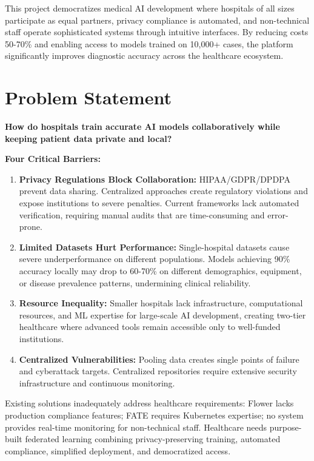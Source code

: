 This project democratizes medical AI development where hospitals of all sizes participate as equal partners, privacy compliance is automated, and non-technical staff operate sophisticated systems through intuitive interfaces. By reducing costs 50-70\% and enabling access to models trained on 10,000+ cases, the platform significantly improves diagnostic accuracy across the healthcare ecosystem.

\section{Problem Statement}

\textbf{How do hospitals train accurate AI models collaboratively while keeping patient data private and local?}

\textbf{Four Critical Barriers:}

\begin{enumerate}
    \item \textbf{Privacy Regulations Block Collaboration:} HIPAA/GDPR/DPDPA prevent data sharing. Centralized approaches create regulatory violations and expose institutions to severe penalties. Current frameworks lack automated verification, requiring manual audits that are time-consuming and error-prone.
    \item \textbf{Limited Datasets Hurt Performance:} Single-hospital datasets cause severe underperformance on different populations. Models achieving 90\% accuracy locally may drop to 60-70\% on different demographics, equipment, or disease prevalence patterns, undermining clinical reliability.
    \item \textbf{Resource Inequality:} Smaller hospitals lack infrastructure, computational resources, and ML expertise for large-scale AI development, creating two-tier healthcare where advanced tools remain accessible only to well-funded institutions.
    \item \textbf{Centralized Vulnerabilities:} Pooling data creates single points of failure and cyberattack targets. Centralized repositories require extensive security infrastructure and continuous monitoring.
\end{enumerate}

Existing solutions inadequately address healthcare requirements: Flower lacks production compliance features; FATE requires Kubernetes expertise; no system provides real-time monitoring for non-technical staff. Healthcare needs purpose-built federated learning combining privacy-preserving training, automated compliance, simplified deployment, and democratized access.

